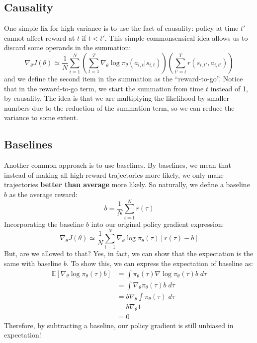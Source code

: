 \subsection{Causality}
One simple fix for high variance is to use the fact of causality: policy at time $t'$ cannot affect reward at $t$ if $t<t'$. This simple commonsensical idea allows us to discard some operands in the summation:
$$\nabla_\theta J(\theta) \simeq \frac{1}{N}\sum_{i=1}^N\left(\sum_{t=1}^T\nabla_\theta \log\pi_\theta(a_{i,t}|s_{i,t})\right)\left(\sum_{t'=t}^T r(s_{i,t'},a_{i,t'})\right)$$
and we define the second item in the summation as the ``reward-to-go''. Notice that in the reward-to-go term, we start the summation from time $t$ instead of 1, by causality. The idea is that we are multiplying the likelihood by smaller numbers due to the reduction of the summation term, so we can reduce the variance to some extent.
\subsection{Baselines}
Another common approach is to use baselines. By baselines, we mean that instead of making all high-reward trajectories more likely, we only make trajectories \textbf{better than average} more likely. So naturally, we define a baseline $b$ as the average reward:
$$b = \frac{1}{N} \sum_{i=1}^Nr(\tau)$$
Incorporating the baseline $b$ into our original policy gradient expression:
$$\nabla_\theta J(\theta) \simeq \frac{1}{N}\sum_{i=1}^N \nabla_\theta \log\pi_\theta(\tau)\left[r(\tau)-b\right]$$
But, are we allowed to that? Yes, in fact, we can show that the expectation is the same with baseline $b$. To show this, we can express the expectation of baseline as:
\begin{align*}
\mathbb{E}\left[\nabla_\theta\log \pi_\theta(\tau)b\right]&=
\int \pi_\theta(\tau)\nabla \log\pi_\theta(\tau)b\;d\tau\\
&=\int \nabla_\theta \pi_\theta(\tau)b\;d\tau\\
&=b\nabla_\theta\int\pi_\theta(\tau)\;d\tau\\
&=b\nabla_\theta 1\\
&=0
\end{align*}
Therefore, by subtracting a baseline, our policy gradient is still unbiased in expectation!
